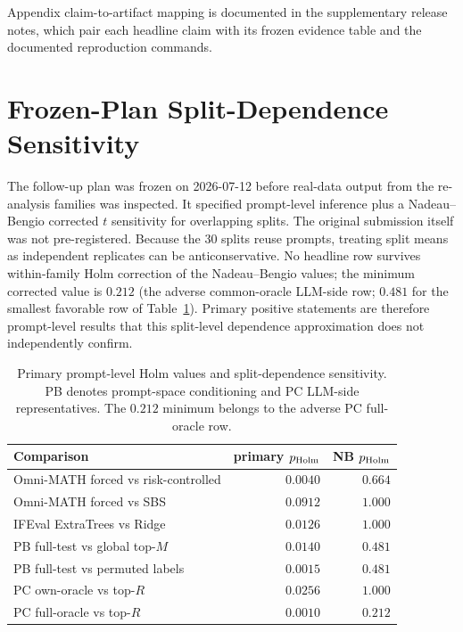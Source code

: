\documentclass{article}
\begin{document}
Appendix claim-to-artifact mapping is documented in the supplementary release notes, which pair each headline claim with its frozen evidence table and the documented reproduction commands.

\section{Frozen-Plan Split-Dependence Sensitivity}
\label{app:prereg-sensitivity}

The follow-up plan was frozen on 2026-07-12 before real-data output from the re-analysis families was inspected. It specified prompt-level inference plus a Nadeau--Bengio corrected $t$ sensitivity for overlapping splits. The original submission itself was not pre-registered. Because the 30 splits reuse prompts, treating split means as independent replicates can be anticonservative. No headline row survives within-family Holm correction of the Nadeau--Bengio values; the minimum corrected value is $0.212$ (the adverse common-oracle LLM-side row; $0.481$ for the smallest favorable row of Table~\ref{tab:app-nb}). Primary positive statements are therefore prompt-level results that this split-level dependence approximation does not independently confirm.

\begin{table}[htbp]
  \caption{Primary prompt-level Holm values and split-dependence sensitivity. PB denotes prompt-space conditioning and PC LLM-side representatives. The $0.212$ minimum belongs to the adverse PC full-oracle row.}
  \label{tab:app-nb}
  \centering
  \scriptsize
  \begin{tabular}{lrr}
    \toprule
    Comparison & primary $p_{\rm Holm}$ & NB $p_{\rm Holm}$ \\
    \midrule
    Omni-MATH forced vs risk-controlled & $0.0040$ & $0.664$ \\
    Omni-MATH forced vs SBS & $0.0912$ & $1.000$ \\
    IFEval ExtraTrees vs Ridge & $0.0126$ & $1.000$ \\
    PB full-test vs global top-$M$ & $0.0140$ & $0.481$ \\
    PB full-test vs permuted labels & $0.0015$ & $0.481$ \\
    PC own-oracle vs top-$R$ & $0.0256$ & $1.000$ \\
    PC full-oracle vs top-$R$ & $0.0010$ & $0.212$ \\
    \bottomrule
  \end{tabular}
\end{table}
\end{document}
